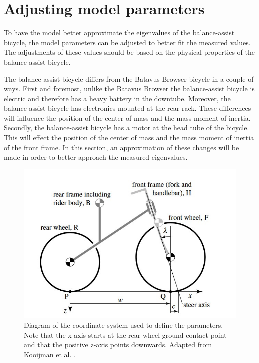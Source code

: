 \documentclass[12pt]{article}
\begin{document}
\section{Adjusting model parameters}
To have the model better approximate the eigenvalues of the balance-assist bicycle, the model parameters can be adjusted to better fit the measured values. The adjustments of these values should be based on the physical properties of the balance-assist bicycle. 

The balance-assist bicycle differs from the Batavus Browser bicycle in a couple of ways. First and foremost, unlike the Batavus Browser the balance-assist bicycle is electric and therefore has a heavy battery in the downtube. Moreover, the balance-assist bicycle has electronics mounted at the rear rack. These differences will influence the position of the center of mass and the mass moment of inertia. Secondly, the balance-assist bicycle has a motor at the head tube of the bicycle. This will effect the position of the center of mass and the mass moment of inertia of the front frame. In this section, an approximation of these changes will be made in order to better approach the measured eigenvalues. 

\begin{figure}
    \centering
    \includegraphics[width=\columnwidth]{figures/KooijmanFBD.jpg}
    \caption{Diagram of the coordinate system used to define the parameters. Note that the x-axis starts at the rear wheel ground contact point and that the positive z-axis points downwards. Adapted from Kooijman et al. \cite{Kooijman2008}.}
\end{figure}
\end{document}
